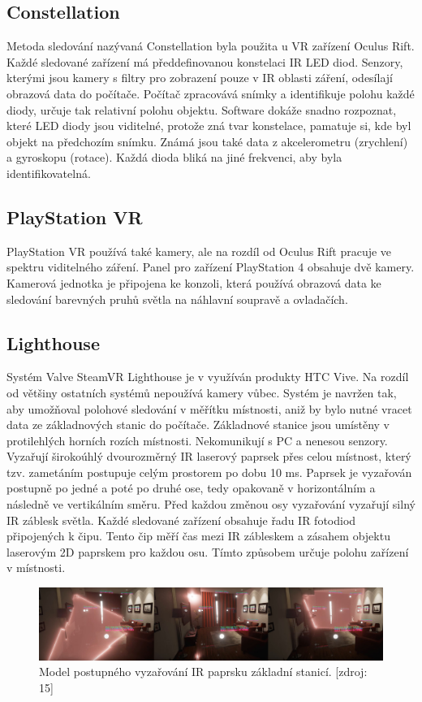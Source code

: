 \documentclass[a4paper, 12pt]{report}
\begin{document}
\subsection{Constellation}
Metoda sledování nazývaná Constellation byla použita u VR zařízení Oculus Rift. Každé sledované zařízení má předdefinovanou konstelaci IR LED diod. Senzory, kterými jsou kamery s filtry pro zobrazení pouze v IR oblasti záření, odesílají obrazová data do počítače. Počítač zpracovává snímky a identifikuje polohu každé diody, určuje tak relativní polohu objektu. Software dokáže snadno rozpoznat, které LED diody jsou viditelné, protože zná tvar konstelace, pamatuje si, kde byl objekt na předchozím snímku. Známá jsou také data z akcelerometru (zrychlení) a gyroskopu (rotace). Každá dioda bliká na jiné frekvenci, aby byla identifikovatelná.

\subsection{PlayStation VR}
PlayStation VR používá také kamery, ale na rozdíl od Oculus Rift pracuje ve spektru viditelného záření. Panel pro zařízení PlayStation 4 obsahuje dvě kamery. Kamerová jednotka je připojena ke konzoli, která používá obrazová data ke sledování barevných pruhů světla na náhlavní soupravě a ovladačích.

\subsection{Lighthouse}
Systém Valve SteamVR Lighthouse je v  využíván produkty HTC Vive. Na rozdíl od většiny ostatních systémů nepoužívá kamery vůbec. Systém je navržen tak, aby umožňoval polohové sledování v měřítku místnosti, aniž by bylo nutné vracet data ze základnových stanic do počítače. Základnové stanice jsou umístěny v protilehlých horních rozích místnosti. Nekomunikují s PC a nenesou senzory. Vyzařují širokoúhlý dvourozměrný IR laserový paprsek přes celou místnost, který tzv. zametáním postupuje celým prostorem po dobu 10 ms. Paprsek je vyzařován postupně po jedné a poté po druhé ose, tedy opakovaně v horizontálním a následně ve vertikálním směru. Před každou změnou osy vyzařování vyzařují silný IR záblesk světla. Každé sledované zařízení obsahuje řadu IR fotodiod připojených k čipu. Tento čip měří čas mezi IR zábleskem a zásahem objektu laserovým 2D paprskem pro každou osu. Tímto způsobem určuje polohu zařízení v místnosti.

\begin{figure}[h!]
	\centering
	\includegraphics[width=16cm]{VIVE_laser.jpg}
	\caption{Model postupného vyzařování IR paprsku základní stanicí. [zdroj: 15]}
\end{figure}
\end{document}
